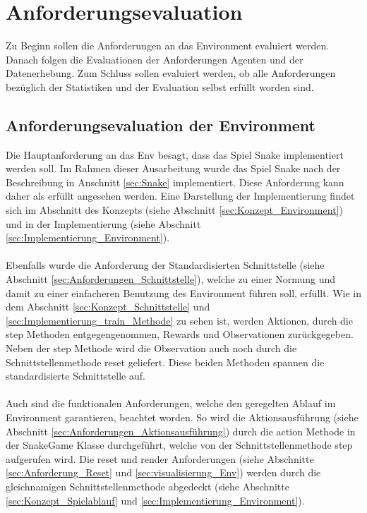 \section{Anforderungsevaluation}
Zu Beginn sollen die Anforderungen an das Environment evaluiert werden. Danach folgen die Evaluationen der Anforderungen Agenten und der Datenerhebung. Zum Schluss sollen evaluiert werden, ob alle Anforderungen bezüglich der Statistiken und der Evaluation selbst erfüllt worden sind.

\subsection{Anforderungsevaluation der Environment}
Die Hauptanforderung an das Env besagt, dass das Spiel Snake implementiert werden soll. Im Rahmen dieser Ausarbeitung wurde das Spiel Snake nach der Beschreibung in Anschnitt \ref{sec:Snake} implementiert. Diese Anforderung kann daher als erfüllt angesehen werden. Eine Darstellung der Implementierung findet sich im Abschnitt des Konzepts (siehe Abschnitt \ref{sec:Konzept_Environment}) und in der Implementierung (siehe Abschnitt \ref{sec:Implementierung_Environment}).\\
\\ Ebenfalls wurde die Anforderung der Standardisierten Schnittstelle (siehe Abschnitt \ref{sec:Anforderungen_Schnittstelle}), welche zu einer Normung und damit zu einer einfacheren Benutzung des Environment führen soll, erfüllt. Wie in dem Abschnitt \ref{sec:Konzept_Schnittstelle} und \ref{sec:Implementierung_train_Methode} zu sehen ist, werden Aktionen, durch die step Methoden entgegengenommen, Rewards und Observationen zurückgegeben. Neben der step Methode wird die Observation auch noch durch die Schnittstellenmethode reset geliefert. Diese beiden Methoden spannen die standardisierte Schnittstelle auf.\\
\\ Auch sind die funktionalen Anforderungen, welche den geregelten Ablauf im Environment garantieren, beachtet worden.
So wird die Aktionsausführung (siehe Abschnitt \ref{sec:Anforderungen_Aktionsausführung}) durch die action Methode in der SnakeGame Klasse durchgeführt, welche von der Schnittstellenmethode step aufgerufen wird. Die reset und render Anforderungen (siehe Abschnitte \ref{sec:Anforderung_Reset} und \ref{sec:visualisierung_Env}) werden durch die gleichnamigen Schnittstellenmethode abgedeckt (siehe Abschnitte \ref{sec:Konzept_Spielablauf} und \ref{sec:Implementierung_Environment}).

